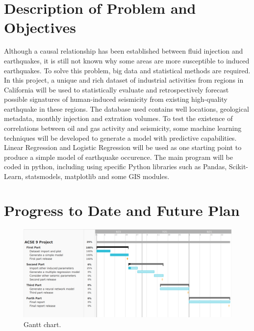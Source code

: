 \documentclass[project-plan]{report-template}
\begin{document}
\section{Description of Problem and Objectives}
Although a causal relationship has been established between fluid injection and earthquakes, it is still not known why some areas are more susceptible to induced earthquakes. To solve this problem, big data and statistical methods are required.
In this project, a unique and rich dataset of industrial activities from regions in California will be used to statistically evaluate and retrospectively forecast possible signatures of human-induced seismicity from existing high-quality earthquake in these regions.
The database used contains well locations, geological metadata, monthly injection and extration volumes. To test the existence of correlations between oil and gas activity and seismicity, some machine learning techniques will be developed to generate a model with predictive capabilities.
Linear Regression and Logistic Regression will be used as one starting point to produce a simple model of earthquake occurence. The main program will be coded in python, including using specific Python libraries such as Pandas, Scikit-Learn, statsmodels, matplotlib and some GIS modules.

\section{Progress to Date and Future Plan}

\begin{figure}
    \begin{center}
        \includegraphics[width=1\textwidth]{gantt.png}
    \end{center}
    \caption{\label{fig:experiment} Gantt chart.}
\end{figure}
\end{document}
